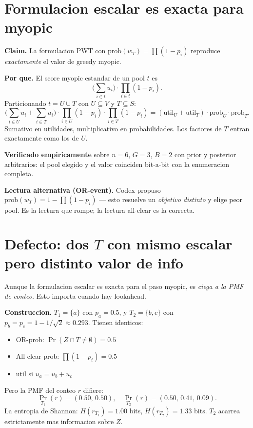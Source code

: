 \documentclass[11pt]{article}
\begin{document}
\section{Formulacion escalar es exacta para myopic}

\textbf{Claim.} La formulacion PWT con $\text{prob}(w_T) = \prod(1-p_i)$
reproduce \emph{exactamente} el valor de greedy myopic.

\textbf{Por que.} El score myopic estandar de un pool $t$ es
\[
\big(\textstyle\sum_{i \in t} u_i\big) \cdot
\textstyle\prod_{i \in t}(1 - p_i).
\]
Particionando $t = U \cup T$ con $U \subseteq V$ y $T \subseteq S$:
\[
\big(\textstyle\sum_{i \in U} u_i + \textstyle\sum_{i \in T} u_i\big) \cdot
\textstyle\prod_{i \in U}(1 - p_i) \cdot
\textstyle\prod_{i \in T}(1 - p_i)
=
(\text{util}_U + \text{util}_T) \cdot \text{prob}_U \cdot \text{prob}_T.
\]
Sumativo en utilidades, multiplicativo en probabilidades. Los factores
de $T$ entran exactamente como los de $U$.

\textbf{Verificado empiricamente} sobre $n=6$, $G=3$, $B=2$ con prior
y posterior arbitrarios: el pool elegido y el valor coinciden
bit-a-bit con la enumeracion completa.

\textbf{Lectura alternativa (OR-event).} Codex propuso
$\text{prob}(w_T) = 1 - \prod(1-p_i)$ — esto resuelve un \emph{objetivo
distinto} y elige peor pool. Es la lectura que rompe; la lectura
all-clear es la correcta.

\section{Defecto: dos $T$ con mismo escalar pero distinto valor de info}

Aunque la formulacion escalar es exacta para el paso myopic, es
\emph{ciega a la PMF de conteo}. Esto importa cuando hay lookahead.

\textbf{Construccion.} $T_1 = \{a\}$ con $p_a = 0.5$, y $T_2 = \{b, c\}$
con $p_b = p_c = 1 - 1/\sqrt{2} \approx 0.293$. Tienen identicos:
\begin{itemize}
\item OR-prob: $\Pr(Z \cap T \ne \emptyset) = 0.5$
\item All-clear prob: $\prod(1 - p_i) = 0.5$
\item util si $u_a = u_b + u_c$
\end{itemize}
Pero la PMF del conteo $r$ difiere:
\[
\Pr_{T_1}(r) = (0.50, \, 0.50), \quad
\Pr_{T_2}(r) = (0.50, \, 0.41, \, 0.09).
\]
La entropia de Shannon:
$H(r_{T_1}) = 1.00$ bits, $H(r_{T_2}) = 1.33$ bits. $T_2$ acarrea
estrictamente mas informacion sobre $Z$.
\end{document}
